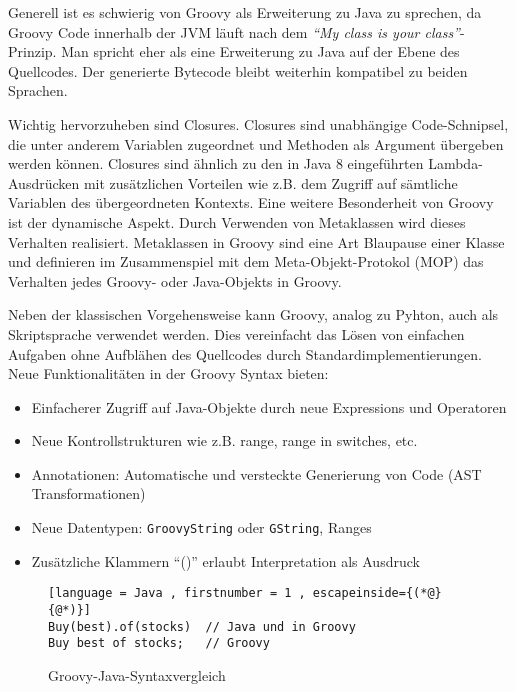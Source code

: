 Generell ist es schwierig von Groovy als Erweiterung zu Java zu sprechen, da Groovy Code innerhalb der JVM läuft nach dem \textit{\enquote{My class is your class}}-Prinzip. Man spricht eher als eine Erweiterung zu Java auf der Ebene des Quellcodes. Der generierte Bytecode bleibt weiterhin kompatibel zu beiden Sprachen.

Wichtig hervorzuheben sind Closures. Closures sind unabhängige Code-Schnipsel, die unter anderem Variablen zugeordnet und Methoden als Argument übergeben werden können.  Closures sind ähnlich zu den in Java 8 eingeführten Lambda-Ausdrücken mit zusätzlichen Vorteilen wie z.B. dem Zugriff auf sämtliche Variablen des übergeordneten Kontexts.
Eine weitere Besonderheit von Groovy ist der dynamische Aspekt. Durch Verwenden von Metaklassen wird dieses Verhalten realisiert.
Metaklassen in Groovy sind eine Art Blaupause einer Klasse und definieren im Zusammenspiel mit dem Meta-Objekt-Protokol (MOP) das Verhalten jedes Groovy- oder Java-Objekts in Groovy.

Neben der klassischen Vorgehensweise kann Groovy, analog zu Pyhton,  auch als Skriptsprache verwendet werden. Dies vereinfacht das Lösen von einfachen Aufgaben ohne Aufblähen des Quellcodes durch Standardimplementierungen.
Neue Funktionalitäten in der Groovy Syntax bieten:

\begin{itemize} [nosep]
	\item Einfacherer Zugriff auf Java-Objekte durch neue Expressions und Operatoren
	\item Neue Kontrollstrukturen wie z.B. range, range in switches, etc.
	\item Annotationen: Automatische und versteckte Generierung von Code (AST Transformationen)
	\item Neue Datentypen: \texttt{GroovyString} oder \texttt{GString}, Ranges
	\item Zusätzliche Klammern \enquote{()} erlaubt Interpretation als Ausdruck
\end{itemize}


\begin{figure} [hbt]
\begin{lstlisting}[language = Java , firstnumber = 1 , escapeinside={(*@}{@*)}]
Buy(best).of(stocks)  // Java und in Groovy
Buy best of stocks;   // Groovy
\end{lstlisting}

\caption{Groovy-Java-Syntaxvergleich}
\label{fig-groovy-java}
\end{figure}


